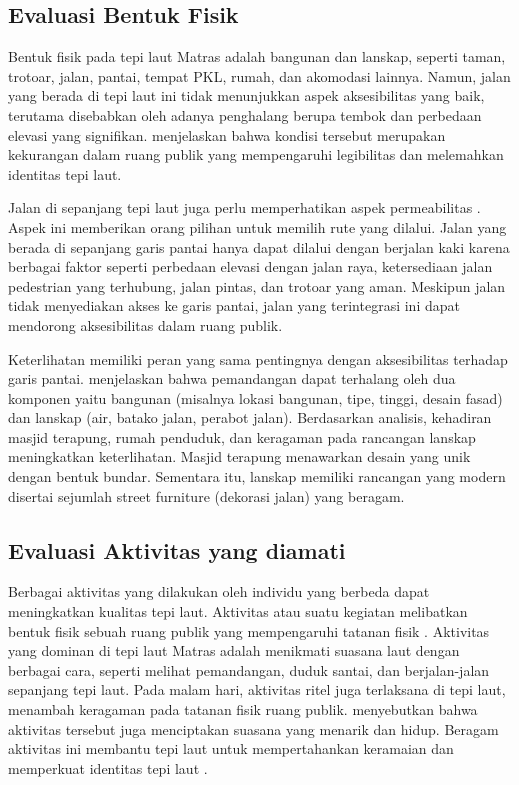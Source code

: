 \documentclass[11pt]{simart} %
\begin{document}
\subsection{Evaluasi Bentuk Fisik}%
\label{sub:Evaluasi Bentuk Fisik}

Bentuk fisik pada tepi laut Matras adalah bangunan dan lanskap, seperti taman, trotoar, jalan, pantai, tempat PKL, rumah, dan akomodasi lainnya. Namun, jalan yang berada di tepi laut ini tidak menunjukkan aspek aksesibilitas yang baik, terutama disebabkan oleh adanya penghalang berupa tembok dan perbedaan elevasi yang signifikan. \cite{iqbal2020} menjelaskan bahwa kondisi tersebut merupakan kekurangan dalam ruang publik yang mempengaruhi legibilitas dan melemahkan identitas tepi laut.

Jalan di sepanjang tepi laut juga perlu memperhatikan aspek permeabilitas \citep{wanismail2018}. Aspek ini memberikan orang pilihan untuk memilih rute yang dilalui. Jalan yang berada di sepanjang garis pantai hanya dapat dilalui dengan berjalan kaki karena berbagai faktor seperti perbedaan elevasi dengan jalan raya, ketersediaan jalan pedestrian yang terhubung, jalan pintas, dan trotoar yang aman. Meskipun jalan tidak menyediakan akses ke garis pantai, jalan yang terintegrasi ini dapat mendorong aksesibilitas dalam ruang publik.

Keterlihatan memiliki peran yang sama pentingnya dengan aksesibilitas terhadap garis pantai. \cite{wanismail2018} menjelaskan bahwa pemandangan dapat terhalang oleh dua komponen yaitu bangunan (misalnya lokasi bangunan, tipe, tinggi, desain fasad) dan lanskap (air, batako jalan, perabot jalan). Berdasarkan analisis, kehadiran masjid terapung, rumah penduduk, dan keragaman pada rancangan lanskap meningkatkan keterlihatan. Masjid terapung menawarkan desain yang unik dengan bentuk bundar. Sementara itu, lanskap memiliki rancangan yang modern disertai sejumlah street furniture (dekorasi jalan) yang beragam.

\subsection{Evaluasi Aktivitas yang diamati}%
\label{sub:Evaluasi Aktivitas yang diamati}

Berbagai aktivitas yang dilakukan oleh individu yang berbeda dapat meningkatkan kualitas tepi laut. Aktivitas atau suatu kegiatan melibatkan bentuk fisik sebuah ruang publik yang mempengaruhi tatanan fisik \citep{wanismail2018}. Aktivitas yang dominan di tepi laut Matras adalah menikmati suasana laut dengan berbagai cara, seperti melihat pemandangan, duduk santai, dan berjalan-jalan sepanjang tepi laut. Pada malam hari, aktivitas ritel juga terlaksana di tepi laut, menambah keragaman pada tatanan fisik ruang publik. \cite{wanismail2018} menyebutkan bahwa aktivitas tersebut juga menciptakan suasana yang menarik dan hidup. Beragam aktivitas ini membantu tepi laut untuk mempertahankan keramaian dan memperkuat identitas tepi laut \citep{iqbal2020}.
\end{document}
